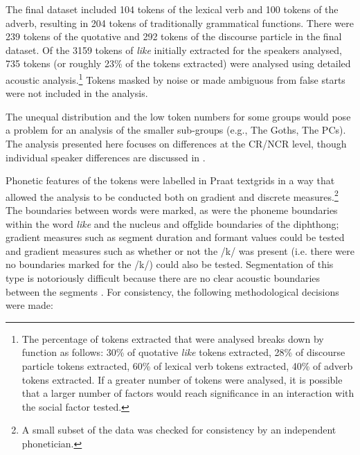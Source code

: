 \newpage
The final dataset included 104 tokens of the lexical verb and 100 tokens of the adverb, resulting in 204 tokens of traditionally grammatical functions. There were 239 tokens of the quotative and 292 tokens of the discourse particle in the final dataset. Of the 3159 tokens of \textit{like} initially extracted for the speakers analysed, 735 tokens (or roughly	23\% of the tokens extracted) were analysed using detailed acoustic analysis.\footnote{The percentage of tokens extracted that were analysed breaks down by function as follows: 30\% of quotative \textit{like} tokens extracted, 28\% of discourse particle tokens extracted, 60\% of lexical verb tokens extracted, 40\% of adverb tokens extracted. If a greater number of tokens were analysed, it is possible that a larger number of factors would reach significance in an interaction with the social factor tested.} Tokens masked by noise or made ambiguous from false starts were not included in the analysis. 

The unequal distribution and the low token numbers for some groups would pose a problem for an analysis of the smaller sub-groups (e.g., The Goths, The PCs). The analysis presented here focuses on differences at the CR/NCR level, though individual speaker differences are discussed in .  

Phonetic features of the tokens were la\-belled in Praat text\-grids \citep{boersmaweenink} in a way that allowed the analysis to be conducted both on gradient and discrete measures.\footnote{A small subset of the data was checked for consistency by an independent phonetician.} The bound\-aries be\-tween words were marked, as were the phoneme boundaries within the word \textit{like} and the nucleus and offglide boundaries of the diphthong; gradient measures such as segment duration and formant values could be tested and gradient measures such as whether or not the /k/ was present (i.e. there were no boundaries marked for the /k/) could also be tested. Segmentation of this type is notoriously difficult because there are no clear acoustic boundaries between the segments \citep[142]{ladefoged2003}. For consistency, the following methodological decisions were made:

